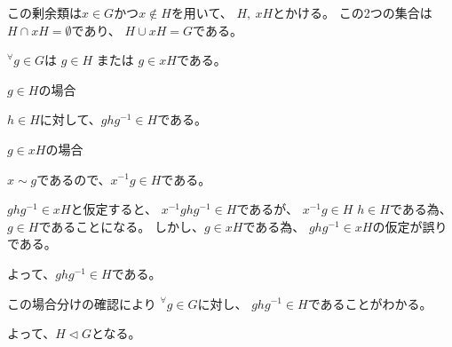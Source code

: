\documentclass[12pt,b5paper]{ltjsarticle}
\begin{document}
この剰余類は$x\in G$かつ$x\not\in H$を用いて、
$H,\ xH$とかける。
この2つの集合は$H \cap xH = \emptyset$であり、
$H \cup xH = G$である。

${}^{\forall}g\in G$は
$g\in H$ または $g\in xH$である。

$g\in H$の場合

$h\in H$に対して、$ghg^{-1} \in H$である。


$g\in xH$の場合

$x\sim g$であるので、$x^{-1}g\in H$である。

$ghg^{-1}\in xH$と仮定すると、
$x^{-1}ghg^{-1}\in H$であるが、
$x^{-1}g\in H$
$h\in H$である為、$g\in H$であることになる。
しかし、$g\in xH$である為、
$ghg^{-1}\in xH$の仮定が誤りである。

よって、$ghg^{-1}\in H$である。


この場合分けの確認により
${}^{\forall}g\in G$に対し、
$ghg^{-1}\in H$であることがわかる。

よって、$H \triangleleft G$となる。
\end{document}
